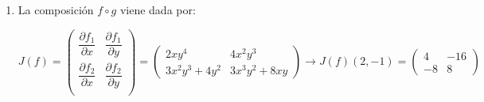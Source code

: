 \begin{enumerate}[label=\color{red}\textbf{\arabic*)}, leftmargin=*]
Ahora calculamos el límite cuando $x\to0$ para evaluar $\dfrac{\partial}{\partial x}\left(\dfrac{\partial f}{\partial y}\right)(0,0)$. \[ \lim_{h
\to0}\dfrac{\frac{\partial f}{\partial y}(h,0)-\frac{\partial f}{\partial y}(0,0)}{h}=\lb{(\ast)}=\lim_{h\to0}\dfrac{\frac{h-\sin h}{h^2}-0}{h}=\left\{\sin h\approx h-\dfrac{h^3}{6}\right\}=\lim_{h\to0}\dfrac{\cancel{h}-\left(\cancel{h}-\frac{h^3}{6}\right)}{h^3}=\lim_{h\to0}\dfrac{\frac{h^3}{6}}{h^3}=\dfrac{1}{6} \]
$\lb{(\ast)=}\dfrac{\partial f}{\partial y}(h,0)=\dfrac{(h\cancelto{1}{\cos0}-\sin h)\cdot \cancel{h^2}}{h^{\cancel{4}}}=\dfrac{h-\sin h}{h^2}$

$\dfrac{\partial^2 f}{\partial y\partial x}(0,0)=\dfrac{\partial }{\partial y}\left(\dfrac{\partial f}{\partial x}(x,y)\right)=\dfrac{\partial }{\partial y}\left(\dfrac{(\sin y-y\cos x)\cdot(x^2+y^2)-(x\sin y-y\sin x)\cdot2x}{(x^2+y^2)^2}\right)$


Ahora calculamos el límite cuando $y\to0$ para evaluar $\dfrac{\partial }{\partial y}\left(\dfrac{\partial f}{\partial x}\right)(0,0)$. \[ \lim_{k\to0}\dfrac{\frac{\partial f}{\partial x}(0, k)-\frac{\partial f}{\partial x}(0,0)}{k}=\lb{(\ast)}=\lim_{k\to0}\dfrac{\frac{\sin k-k}{k^2}-0}{k}=\left\{\sin k\approx k-\dfrac{k^3}{6}\right\}=\lim_{k\to0}\dfrac{\left(\cancel{k}-\frac{k^3}{6}\right)-\cancel{k}}{k^3}=\lim_{k\to0}-\dfrac{\frac{k^3}{6}}{k^3}=-\dfrac{1}{6} \]
$\lb{(\ast)=} \dfrac{\partial f}{\partial x}(0,k)=\dfrac{(\sin k-k\cancelto{1}{\cos0})\cdot \cancel{k^2}}{k^{\cancel{4}}}=\dfrac{\sin k-k}{k^2}$

\item {}


La composición $f\circ g$ viene dada por:
\begin{center}
\end{center}

$J(f)=\begin{pmatrix}
\dfrac{\partial f_1}{\partial x} & \dfrac{\partial f_1}{\partial y}\\
\dfrac{\partial f_2}{\partial x} & \dfrac{\partial f_2}{\partial y}\\
\end{pmatrix}=\begin{pmatrix}
2xy^4 & 4x^2y^3\\
3x^2y^3+4y^2 & 3x^3y^2+8xy
\end{pmatrix}\longrightarrow J(f)(2,-1)=\begin{pmatrix}
4 & -16\\
-8 & 8
\end{pmatrix}$


\end{enumerate}
